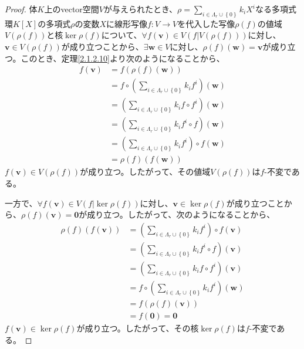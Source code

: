 \documentclass[dvipdfmx]{jsarticle}
\begin{document}
\begin{proof}
体$K$上のvector空間$V$が与えられたとき、$\rho = \sum_{i \in \varLambda_{r} \cup \left\{ 0 \right\}} {k_{i}X^{i}}$なる多項式環$K[ X]$の多項式$\rho$の変数$X$に線形写像$f:V \rightarrow V$を代入した写像$\rho(f)$の値域$V\left( \rho(f) \right)$と核$\ker{\rho(f)}$について、$\forall f\left( \mathbf{v} \right) \in V\left( f|V\left( \rho(f) \right) \right)$に対し、$\mathbf{v} \in V\left( \rho(f) \right)$が成り立つことから、$\exists\mathbf{w} \in V$に対し、$\rho(f)\left( \mathbf{w} \right) = \mathbf{v}$が成り立つ。このとき、定理\ref{2.1.2.10}より次のようになることから、
\begin{align*}
f\left( \mathbf{v} \right) &= f\left( \rho(f)\left( \mathbf{w} \right) \right)\\
&= f \circ \left( \sum_{i \in \varLambda_{r} \cup \left\{ 0 \right\}} {k_{i}f^{i}} \right)\left( \mathbf{w} \right)\\
&= \left( \sum_{i \in \varLambda_{r} \cup \left\{ 0 \right\}} {k_{i}f \circ f^{i}} \right)\left( \mathbf{w} \right)\\
&= \left( \sum_{i \in \varLambda_{r} \cup \left\{ 0 \right\}} {k_{i}f^{i} \circ f} \right)\left( \mathbf{w} \right)\\
&= \left( \sum_{i \in \varLambda_{r} \cup \left\{ 0 \right\}} {k_{i}f^{i}} \right) \circ f\left( \mathbf{w} \right)\\
&= \rho(f)\left( f\left( \mathbf{w} \right) \right)
\end{align*}
$f\left( \mathbf{v} \right) \in V\left( \rho(f) \right)$が成り立つ。したがって、その値域$V\left( \rho(f) \right)$は$f$-不変である。\par
一方で、$\forall f\left( \mathbf{v} \right) \in V\left( f|\ker{\rho(f)} \right)$に対し、$\mathbf{v} \in \ker{\rho(f)}$が成り立つことから、$\rho(f)\left( \mathbf{v} \right) = \mathbf{0}$が成り立つ。したがって、次のようになることから、
\begin{align*}
\rho(f)\left( f\left( \mathbf{v} \right) \right) &= \left( \sum_{i \in \varLambda_{r} \cup \left\{ 0 \right\}} {k_{i}f^{i}} \right) \circ f\left( \mathbf{v} \right)\\
&= \left( \sum_{i \in \varLambda_{r} \cup \left\{ 0 \right\}} {k_{i}f^{i} \circ f} \right)\left( \mathbf{v} \right)\\
&= \left( \sum_{i \in \varLambda_{r} \cup \left\{ 0 \right\}} {k_{i}f \circ f^{i}} \right)\left( \mathbf{v} \right)\\
&= f \circ \left( \sum_{i \in \varLambda_{r} \cup \left\{ 0 \right\}} {k_{i}f^{i}} \right)\left( \mathbf{w} \right)\\
&= f\left( \rho(f)\left( \mathbf{v} \right) \right)\\
&= f\left( \mathbf{0} \right) = \mathbf{0}
\end{align*}
$f\left( \mathbf{v} \right) \in \ker{\rho(f)}$が成り立つ。したがって、その核$\ker{\rho(f)}$は$f$-不変である。
\end{proof}
\end{document}
